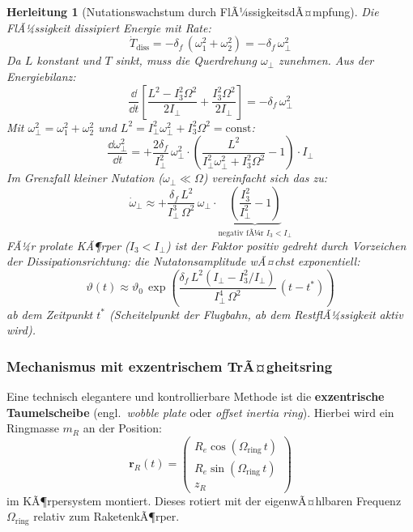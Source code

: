 ﻿\documentclass[12pt,a4paper]{article}
\newtheorem{herleitung}{Herleitung}[section]
\newcommand{\vek}[1]{\boldsymbol{#1}}
\begin{document}
\begin{herleitung}[Nutationswachstum durch FlÃ¼ssigkeitsdÃ¤mpfung]
Die FlÃ¼ssigkeit dissipiert Energie mit Rate:
\[
  \dot{T}_{\mathrm{diss}} = -\delta_f\,(\omega_1^2 + \omega_2^2)
  = -\delta_f\,\omega_\perp^2
\]
Da $L$ konstant und $T$ sinkt, muss die Querdrehung $\omega_\perp$ zunehmen.
Aus der Energiebilanz:
\[
  \frac{\dd}{\dd t}\!\left[\frac{L^2 - I_3^2\Omega^2}{2I_\perp} + \frac{I_3^2\Omega^2}{2I_\perp}\right]
  = -\delta_f\,\omega_\perp^2
\]
Mit $\omega_\perp^2 = \omega_1^2 + \omega_2^2$ und $L^2 = I_\perp^2\omega_\perp^2 + I_3^2\Omega^2 = \mathrm{const}$:
\[
  \frac{\dd\omega_\perp^2}{\dd t} = +\frac{2\delta_f}{I_\perp^2}\,\omega_\perp^2
  \cdot\left(\frac{L^2}{I_\perp^2\omega_\perp^2 + I_3^2\Omega^2} - 1\right) \cdot I_\perp
\]
Im Grenzfall kleiner Nutation ($\omega_\perp \ll \Omega$) vereinfacht sich das zu:
\[
  \dot{\omega}_\perp \approx +\frac{\delta_f\,L^2}
    {I_\perp^3\,\Omega^2}\,\omega_\perp
  \cdot\underbrace{\left(\frac{I_3^2}{I_\perp^2} - 1\right)}_{\text{negativ fÃ¼r } I_3 < I_\perp}
\]
FÃ¼r prolate KÃ¶rper ($I_3 < I_\perp$) ist der Faktor \emph{positiv gedreht durch Vorzeichen
der Dissipationsrichtung:} die Nutatonsamplitude \emph{wÃ¤chst exponentiell}:
\[
  \boxed{\vartheta(t) \approx \vartheta_0\,\exp\!\left(\frac{\delta_f\,L^2(I_\perp - I_3^2/I_\perp)}
    {I_\perp^4\,\Omega^2}\,(t-t^*)\right)}
\]
ab dem Zeitpunkt $t^*$ (Scheitelpunkt der Flugbahn, ab dem RestflÃ¼ssigkeit aktiv wird).
\end{herleitung}

\subsubsection{Mechanismus mit exzentrischem TrÃ¤gheitsring}

Eine technisch elegantere und kontrollierbare Methode ist die \textbf{exzentrische
Taumelscheibe} (engl.\ \emph{wobble plate} oder \emph{offset inertia ring}).
Hierbei wird ein Ringmasse $m_R$ an der Position:
\[
  \vek{r}_R(t) = \begin{pmatrix}
    R_e \cos(\Omega_{\mathrm{ring}}\,t)\\
    R_e \sin(\Omega_{\mathrm{ring}}\,t)\\
    z_R
  \end{pmatrix}
\]
im KÃ¶rpersystem montiert. Dieses rotiert mit der eigenwÃ¤hlbaren Frequenz
$\Omega_{\mathrm{ring}}$ relativ zum RaketenkÃ¶rper.
\end{document}
